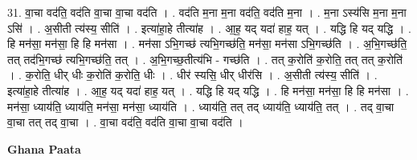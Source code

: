 \documentclass[17pt]{extarticle}
\begin{document}
31. वा॒चा वद॑ति॒ वद॑ति वा॒चा वा॒चा वद॑ति । . वद॑ति म॒ना म॒ना वद॑ति॒ वद॑ति म॒ना । . म॒ना ऽस्य॑सि म॒ना म॒ना ऽसि॑ । . अ॒सीती त्य॑स्य॒ सीति॑ । . इत्या॑हा॒हे तीत्या॑ह । . आ॒ह॒ यद् यदा॑ हाह॒ यत् । . यद्धि हि यद् यद्धि । . हि मन॑सा॒ मन॑सा॒ हि हि मन॑सा । . मन॑सा ऽभि॒गच्छ॑ त्यभि॒गच्छ॑ति॒ मन॑सा॒ मन॑सा ऽभि॒गच्छ॑ति । . अ॒भि॒गच्छ॑ति॒ तत् तद॑भि॒गच्छ॑ त्यभि॒गच्छ॑ति॒ तत् । . अ॒भि॒गच्छ॒तीत्य॑भि - गच्छ॑ति । . तत् क॒रोति॑ क॒रोति॒ तत् तत् क॒रोति॑ । . क॒रोति॒ धीर् धीः क॒रोति॑ क॒रोति॒ धीः । . धीर॑ स्यसि॒ धीर् धीर॑सि । . अ॒सीती त्य॑स्य॒ सीति॑ । . इत्या॑हा॒हे तीत्या॑ह । . आ॒ह॒ यद् यदा॑ हाह॒ यत् । . यद्धि हि यद् यद्धि । . हि मन॑सा॒ मन॑सा॒ हि हि मन॑सा । . मन॑सा॒ ध्याय॑ति॒ ध्याय॑ति॒ मन॑सा॒ मन॑सा॒ ध्याय॑ति । . ध्याय॑ति॒ तत् तद् ध्याय॑ति॒ ध्याय॑ति॒ तत् । . तद् वा॒चा वा॒चा तत् तद् वा॒चा । . वा॒चा वद॑ति॒ वद॑ति वा॒चा वा॒चा वद॑ति । \newline

\textbf{Ghana Paata } \newline
\end{document}
